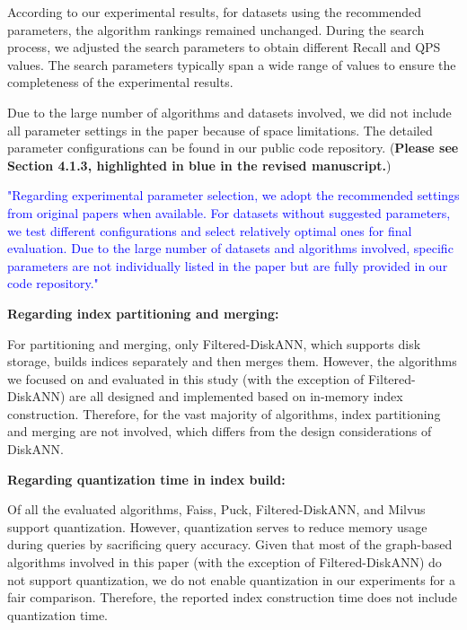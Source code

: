 \documentclass[sigconf, nonacm]{acmart}
\newcounter{detailed}[section]
\begin{document}
According to our experimental results, for datasets using the recommended parameters, the algorithm rankings remained unchanged. During the search process, we adjusted the search parameters to obtain different Recall and QPS values. The search parameters typically span a wide range of values to ensure the completeness of the experimental results.

Due to the large number of algorithms and datasets involved, we did not include all parameter settings in the paper because of space limitations. The detailed parameter configurations can be found in our public code repository. (\textbf{Please see Section 4.1.3, highlighted in blue in the revised manuscript.})

	\textcolor{blue}{
"Regarding experimental parameter selection, we adopt the recommended settings from original papers when available. For datasets without suggested parameters, we test different configurations and select relatively optimal ones for final evaluation. Due to the large number of datasets and algorithms involved, specific parameters are not individually listed in the paper but are fully provided in our code repository."}
 
\textbf{Regarding index partitioning and merging:}

For partitioning and merging, only Filtered-DiskANN, which supports disk storage, builds indices separately and then merges them. However, the algorithms we focused on and evaluated in this study (with the exception of Filtered-DiskANN) are all designed and implemented based on in-memory index construction. Therefore, for the vast majority of algorithms, index partitioning and merging are not involved, which differs from the design considerations of DiskANN.

\textbf{Regarding quantization time in index build:}

Of all the evaluated algorithms, Faiss, Puck, Filtered-DiskANN, and Milvus support quantization.
However, quantization serves to reduce memory usage during queries by sacrificing query accuracy. Given that most of the graph-based algorithms involved in this paper (with the exception of Filtered-DiskANN) do not support quantization, we do not enable quantization in our experiments for a fair comparison. Therefore, the reported index construction time does not include quantization time. 
\end{document}
